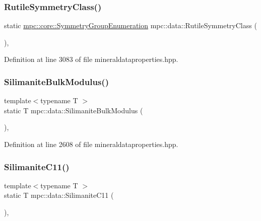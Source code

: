 \subsubsection{\texorpdfstring{Rutile\+Symmetry\+Class()}{RutileSymmetryClass()}}
{\footnotesize\ttfamily static \mbox{\hyperlink{namespacempc_1_1core_a9d979684062547055a0ef5c13077bad8}{mpc\+::core\+::\+Symmetry\+Group\+Enumeration}} mpc\+::data\+::\+Rutile\+Symmetry\+Class (\begin{DoxyParamCaption}{ }\end{DoxyParamCaption})\hspace{0.3cm}{\ttfamily [inline]}, {\ttfamily [static]}}



Definition at line 3083 of file mineraldataproperties.\+hpp.

\mbox{\label{namespacempc_1_1data_a64569698c17a0ac4e1bb5a26ef380d6c}} 
\subsubsection{\texorpdfstring{Silimanite\+Bulk\+Modulus()}{SilimaniteBulkModulus()}}
{\footnotesize\ttfamily template$<$typename T $>$ \\
static T mpc\+::data\+::\+Silimanite\+Bulk\+Modulus (\begin{DoxyParamCaption}{ }\end{DoxyParamCaption})\hspace{0.3cm}{\ttfamily [inline]}, {\ttfamily [static]}}



Definition at line 2608 of file mineraldataproperties.\+hpp.

\mbox{\label{namespacempc_1_1data_a4ec355be073aed9bf4ed97660b8635e9}} 
\subsubsection{\texorpdfstring{Silimanite\+C11()}{SilimaniteC11()}}
{\footnotesize\ttfamily template$<$typename T $>$ \\
static T mpc\+::data\+::\+Silimanite\+C11 (\begin{DoxyParamCaption}{ }\end{DoxyParamCaption})\hspace{0.3cm}{\ttfamily [inline]}, {\ttfamily [static]}}



